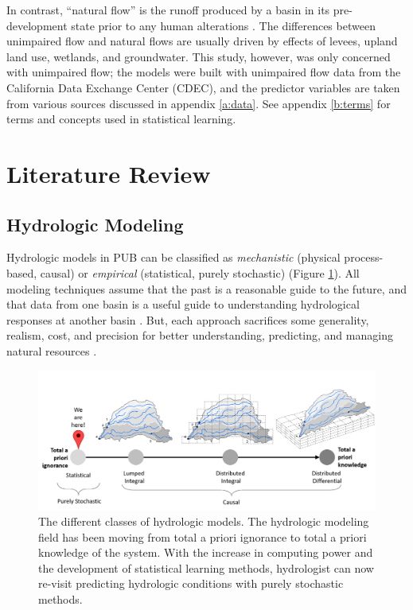 In contrast, ``natural flow'' is the runoff produced by a basin in its pre-development state prior to any human alterations \cite{poff1997natural}. The differences between unimpaired flow and natural flows are usually driven by effects of levees, upland land use, wetlands, and groundwater. This study, however, was only concerned with unimpaired flow; the models were built with unimpaired flow data from the California Data Exchange Center (CDEC), and the predictor variables are taken from various sources discussed in appendix \ref{a:data}. See appendix \ref{b:terms} for terms and concepts used in statistical learning. 

\section{Literature Review}

\subsection{Hydrologic Modeling}
Hydrologic models in PUB can be classified as \textit{mechanistic} (physical process-based, causal) or \textit{empirical} (statistical, purely stochastic) \cite{guisan2000predictive} (Figure \ref{fig:hydmodelclasses}). All modeling techniques assume that the past is a reasonable guide to the future, and that data from one basin is a useful guide to understanding hydrological responses at another basin \cite{sivapalan2003prediction}. But, each approach sacrifices some generality, realism, cost, and precision for better understanding, predicting, and managing natural resources \cite{levins1966strategy, klemes1982empirical}. 

 \begin{figure}
	\centering
	\includegraphics[width=16.51cm,trim={0 0 0 1.75cm},clip=true]{plots/ch1_hyd_model_classes.png}
	\caption{The different classes of hydrologic models. The hydrologic modeling field has been moving from total a priori ignorance to total a priori knowledge of the system. With the increase in computing power and the development of statistical learning methods, hydrologist can now re-visit predicting hydrologic conditions with purely stochastic methods.} 
	\label{fig:hydmodelclasses}
\end{figure}

